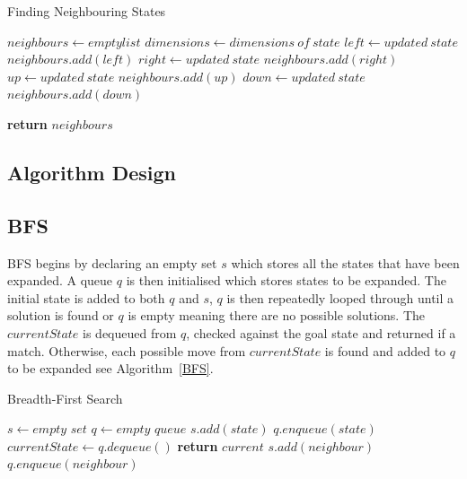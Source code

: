 \documentclass[final]{cmpreport}
\begin{document}
	
\begin{algorithm}
	\caption{Finding Neighbouring States}\label{neighbouring_nodes}
	\begin{algorithmic}[1]
			
		\State$neighbours\gets empty list$
		\State$dimensions\gets 	dimensions\ of\ state$ 
			 
			\State $left \gets updated\ state$	
			\State $neighbours.add(left)$
			\EndIf
			 
			\State $right \gets updated\ state$
			\State $neighbours.add(right)$
			\EndIf
				
			\State $up \gets updated\ state$
			\State $neighbours.add(up)$
			\EndIf
			 
			\State $down \gets updated\ state$
			\State $neighbours.add(down)$
			\EndIf
			
		\State \textbf{return} $neighbours$	
		\EndProcedure
	\end{algorithmic}
\end{algorithm}








\subsection{Algorithm Design}

\subsection{BFS}

BFS begins by declaring an empty set $s$ which stores all the states that have been expanded. A queue $q$ is then initialised which stores states to be expanded. The initial state is added to both $q$ and $s$, $q$ is then repeatedly looped through until a solution is found or $q$ is empty meaning there are no possible solutions. The $currentState$ is dequeued from $q$, checked against the goal state and returned if a match. Otherwise, each possible move from $currentState$ is found and added to $q$ to be expanded see Algorithm~\ref{BFS}.
\begin{algorithm}
	\caption{Breadth-First Search}\label{BFS}
	\begin{algorithmic}[1]
		\State $s \gets \textit{empty set}$
		\State $q \gets \textit{empty queue}$
		\State $s.add(state)$
		\State $q.enqueue(state)$
		\State $currentState \gets q.dequeue()$
		\State \textbf{return} $current$
		\EndIf
		\State $s.add(neighbour)$
		\State $q.enqueue(neighbour)$
		\EndIf
		
		\EndFor
		\EndWhile
		\EndProcedure
	\end{algorithmic}
\end{algorithm}
\end{document}
